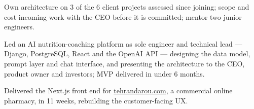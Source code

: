 \begin{CVbody}
{\small
\begin{itemlist}
    \item Own architecture on 3 of the 6 client projects assessed since joining; scope and cost incoming work with the CEO before it is committed; mentor two junior engineers.
    \item Led an AI nutrition-coaching platform as sole engineer and technical lead --- Django, PostgreSQL, React and the OpenAI API --- designing the data model, prompt layer and chat interface, and presenting the architecture to the CEO, product owner and investors; MVP delivered in under 6 months.
    \item Delivered the Next.js front end for \href{https://tehrandarou.com}{tehrandarou.com}, a commercial online pharmacy, in 11 weeks, rebuilding the customer-facing UX.
\end{itemlist}}

\vspace{0.75em} %


\end{CVbody}
